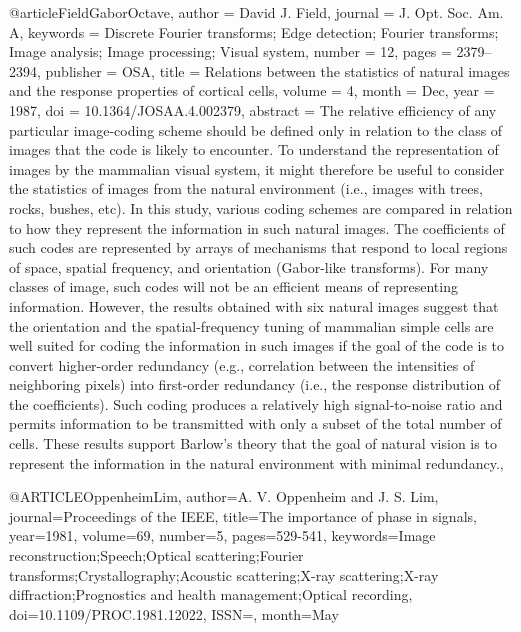 \documentclass[10pt,polish,a4paper,oneside]{ppfcmthesis}
\begin{document}
{@article{FieldGaborOctave,
    author = {David J. Field},
    journal = {J. Opt. Soc. Am. A},
    keywords = {Discrete Fourier transforms; Edge detection; Fourier transforms; Image analysis; Image processing; Visual system},
    number = {12},
    pages = {2379--2394},
    publisher = {OSA},
    title = {Relations between the statistics of natural images and the response properties of cortical cells},
    volume = {4},
    month = {Dec},
    year = {1987},
    doi = {10.1364/JOSAA.4.002379},
    abstract = {The relative efficiency of any particular image-coding scheme should be defined only in relation to the class of images that the code is likely to encounter. To understand the representation of images by the mammalian visual system, it might therefore be useful to consider the statistics of images from the natural environment (i.e., images with trees, rocks, bushes, etc). In this study, various coding schemes are compared in relation to how they represent the information in such natural images. The coefficients of such codes are represented by arrays of mechanisms that respond to local regions of space, spatial frequency, and orientation (Gabor-like transforms). For many classes of image, such codes will not be an efficient means of representing information. However, the results obtained with six natural images suggest that the orientation and the spatial-frequency tuning of mammalian simple cells are well suited for coding the information in such images if the goal of the code is to convert higher-order redundancy (e.g., correlation between the intensities of neighboring pixels) into first-order redundancy (i.e., the response distribution of the coefficients). Such coding produces a relatively high signal-to-noise ratio and permits information to be transmitted with only a subset of the total number of cells. These results support Barlow's theory that the goal of natural vision is to represent the information in the natural environment with minimal redundancy.},
}

@ARTICLE{OppenheimLim,
    author={A. V. {Oppenheim} and J. S. {Lim}},
    journal={Proceedings of the IEEE},
    title={The importance of phase in signals},
    year={1981},
    volume={69},
    number={5},
    pages={529-541},
    keywords={Image reconstruction;Speech;Optical scattering;Fourier transforms;Crystallography;Acoustic scattering;X-ray scattering;X-ray diffraction;Prognostics and health management;Optical recording},
    doi={10.1109/PROC.1981.12022},
    ISSN={},
    month={May}
}

}
\end{document}
